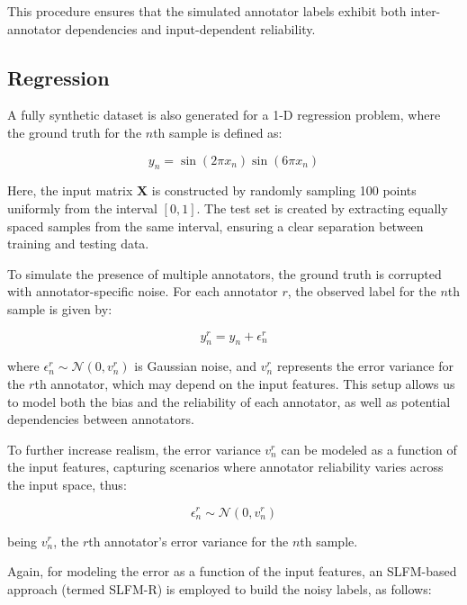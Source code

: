 This procedure ensures that the simulated annotator labels exhibit
both inter-annotator dependencies and input-dependent reliability.

\subsection{Regression}

A fully synthetic dataset is also generated for a 1-D regression problem,
where the ground truth for the $n$th sample is defined as:

\begin{equation}\label{eq:regression_targets}
y_n = \sin(2\pi x_n) \sin(6\pi x_n)
\end{equation}

Here, the input matrix $\mathbf{X}$ is constructed by randomly
sampling 100 points uniformly from the interval $[0, 1]$. The test
set is created by extracting equally spaced samples from the same
interval, ensuring a clear separation between training and testing data.

To simulate the presence of multiple annotators, the ground truth is
corrupted with annotator-specific noise. For each annotator $r$, the
observed label for the $n$th sample is given by:

\[
y_n^{r} = y_n + \epsilon_n^{r}
\]

where $\epsilon_n^{r} \sim \mathcal{N}(0, v_n^{r})$ is Gaussian
noise, and $v_n^{r}$ represents the error variance for the $r$th
annotator, which may depend on the input features. This setup allows
us to model both the bias and the reliability of each annotator, as
well as potential dependencies between annotators.

To further increase realism, the error variance $v_n^{r}$ can be
modeled as a function of the input features, capturing scenarios
where annotator reliability varies across the input space, thus:

\[
\epsilon_n^r \sim \mathcal{N}(0, v_n^r)
\]

being $v_n^r$, the $r$th annotator's error variance for the $n$th sample.

Again, for modeling the error as a function of the input features,
an \gls{SLFM}-based approach (termed SLFM-R) is employed to build the
noisy labels, as follows:


